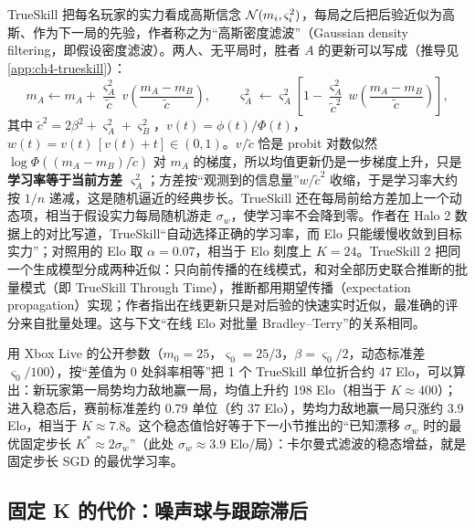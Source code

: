 TrueSkill 把每名玩家的实力看成高斯信念 $\mathcal{N}(m_i,\varsigma_i^2)$，每局之后把后验近似为高斯、作为下一局的先验，作者称之为“高斯密度滤波”（Gaussian density filtering，即假设密度滤波）\cite{herbrich2006trueskill}\tagLit。两人、无平局时，胜者 $A$ 的更新可以写成（推导见\cref{app:ch4-trueskill}）：
\begin{equation}
m_A\leftarrow m_A+\frac{\varsigma_A^2}{\tilde c}\,v\!\left(\frac{m_A-m_B}{\tilde c}\right),\qquad
\varsigma_A^2\leftarrow\varsigma_A^2\left[1-\frac{\varsigma_A^2}{\tilde c^{2}}\,w\!\left(\frac{m_A-m_B}{\tilde c}\right)\right],
\label{eq:ch4-ts}
\end{equation}
其中 $\tilde c^2=2\beta^2+\varsigma_A^2+\varsigma_B^2$，$v(t)=\phi(t)/\Phi(t)$，$w(t)=v(t)\,[v(t)+t]\in(0,1)$。$v/\tilde c$ 恰是 probit 对数似然 $\log\Phi\!\left((m_A-m_B)/\tilde c\right)$ 对 $m_A$ 的梯度，所以均值更新仍是一步梯度上升，只是\textbf{学习率等于当前方差 $\varsigma_A^2$}；方差按“观测到的信息量”$w/\tilde c^2$ 收缩，于是学习率大约按 $1/n$ 递减，这是随机逼近的经典步长。TrueSkill 还在每局前给方差加上一个动态项，相当于假设实力每局随机游走 $\sigma_w$，使学习率不会降到零。作者在 Halo 2 数据上的对比写道，TrueSkill“自动选择正确的学习率，而 Elo 只能缓慢收敛到目标实力”；对照用的 Elo 取 $\alpha=0.07$，相当于 Elo 刻度上 $K=24$\cite{herbrich2006trueskill}\tagLit。TrueSkill 2 把同一个生成模型分成两种近似：只向前传播的在线模式，和对全部历史联合推断的批量模式（即 TrueSkill Through Time），推断都用期望传播（expectation propagation）实现；作者指出在线更新只是对后验的快速实时近似，最准确的评分来自批量处理\cite{minka2018trueskill}\tagLit。这与下文“在线 Elo 对批量 Bradley–Terry”的关系相同。

用 Xbox Live 的公开参数（$m_0=25$，$\varsigma_0=25/3$，$\beta=\varsigma_0/2$，动态标准差 $\varsigma_0/100$）\cite{herbrich2006trueskill}\tagLit，按“差值为 0 处斜率相等”把 1 个 TrueSkill 单位折合约 47 Elo，可以算出\tagOwn：新玩家第一局势均力敌地赢一局，均值上升约 198 Elo（相当于 $K\approx 400$）；进入稳态后，赛前标准差约 0.79 单位（约 37 Elo），势均力敌地赢一局只涨约 3.9 Elo，相当于 $K\approx7.8$。这个稳态值恰好等于下一小节推出的“已知漂移 $\sigma_w$ 时的最优固定步长 $K^*\approx2\sigma_w$”（此处 $\sigma_w\approx3.9$ Elo/局）：卡尔曼式滤波的稳态增益，就是固定步长 SGD 的最优学习率。

\subsection{固定 K 的代价：噪声球与跟踪滞后}
\label{sec:ch4-k}

